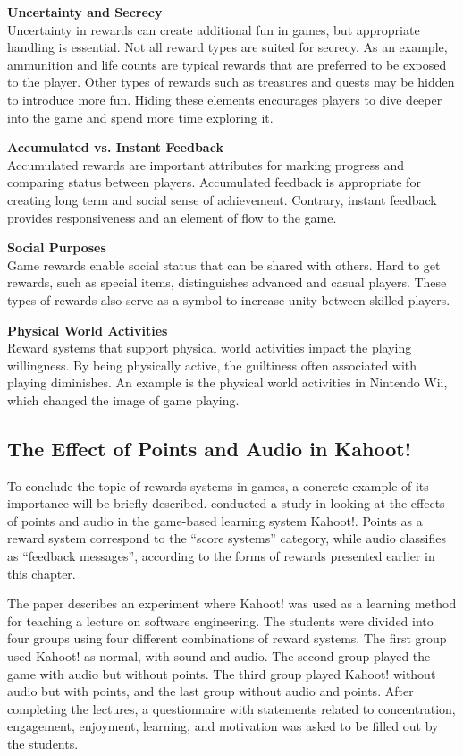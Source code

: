 \documentclass[../Main.tex]{subfiles}
\begin{document}
\textbf{Uncertainty and Secrecy}\\
Uncertainty in rewards can create additional fun in games, but appropriate handling is essential. Not all reward types are suited for secrecy. As an example, ammunition and life counts are typical rewards that are preferred to be exposed to the player. Other types of rewards such as treasures and quests may be hidden to introduce more fun. Hiding these elements encourages players to dive deeper into the game and spend more time exploring it. 

\textbf{Accumulated vs. Instant Feedback}\\
Accumulated rewards are important attributes for marking progress and comparing status between players. Accumulated feedback is appropriate for creating long term and social sense of achievement. Contrary, instant feedback provides responsiveness and an element of flow to the game.

\textbf{Social Purposes}\\
Game rewards enable social status that can be shared with others. Hard to get rewards, such as special items, distinguishes advanced and casual players. These types of rewards also serve as a symbol to increase unity between skilled players.

\textbf{Physical World Activities}\\
Reward systems that support physical world activities impact the playing willingness. By being physically active, the guiltiness often associated with playing diminishes. An example is the physical world activities in Nintendo Wii, which changed the image of game playing. 

\subsection{The Effect of Points and Audio in Kahoot!}
To conclude the topic of rewards systems in games, a concrete example of its importance will be briefly described. \citeauthor{wang_effect_2016} conducted a study in \citeyear{wang_effect_2016} looking at the effects of points and audio in the game-based learning system Kahoot!. Points as a reward system correspond to the “score systems” category, while audio classifies as “feedback messages”, according to the forms of rewards presented earlier in this chapter.  

The paper describes an experiment where Kahoot! was used as a learning method for teaching a lecture on software engineering. The students were divided into four groups using four different combinations of reward systems. The first group used Kahoot! as normal, with sound and audio. The second group played the game with audio but without points. The third group played Kahoot! without audio but with points, and the last group without audio and points. After completing the lectures, a questionnaire with statements related to concentration, engagement, enjoyment, learning, and motivation was asked to be filled out by the students. 
\end{document}
